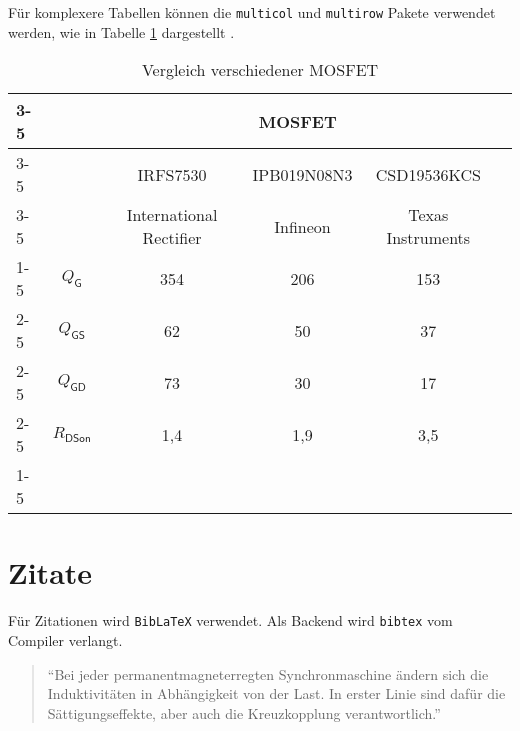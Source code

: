 Für komplexere Tabellen können die \verb|multicol| und \verb|multirow| Pakete verwendet werden, wie in Tabelle \ref{tab:vgl_mosfet} dargestellt \cite{dalton}.
\begin{table}[h]
		\centering
	\renewcommand{\arraystretch}{1.6}
\begin{tabular}{lc|c|c|c|l}
	\cline{3-5}
	& \multicolumn{1}{l|}{} & \multicolumn{3}{c|}{MOSFET}             &  \\ \cline{3-5}
	& \multicolumn{1}{l|}{} & IRFS7530       & IPB019N08N3 & CSD19536KCS &  \\ \cline{3-5}
	& \multicolumn{1}{l|}{} & International Rectifier       & Infineon & Texas Instruments &  \\ \cline{1-5}
	
	\multicolumn{1}{|l|}{\multirow{4}{*}{\begin{turn}{90}Parameter\end{turn}}} & $Q_{\mathsf{G}}$                    &   354 \nano\coulomb             &  206 \nano\coulomb           &   153 \nano\coulomb      &  \\ \cline{2-5}
	\multicolumn{1}{|l|}{}                                                           & $Q_{\mathsf{GS}}$                   &  62 \nano\coulomb             &  50 \nano\coulomb          &  37 \nano\coulomb       &  \\ \cline{2-5}
	\multicolumn{1}{|l|}{}                                                           & $Q_{\mathsf{GD}}$                   & 73 \nano\coulomb              &  30 \nano\coulomb           &  17 \nano\coulomb       &  \\ \cline{2-5}
	\multicolumn{1}{|l|}{}                                                           & $R_{\mathsf{DSon}}$                 & 1,4 \milli\ohm & 1,9 \milli\ohm            &  3,5 \milli\ohm        &  \\ \cline{1-5}
\end{tabular}
	
	\caption{Vergleich verschiedener MOSFET \cite{dalton}}
	\label{tab:vgl_mosfet}
\end{table}
\FloatBarrier

\section{Zitate}\label{sec:cite}
Für Zitationen wird \verb|BibLaTeX| verwendet. Als Backend wird \verb|bibtex| vom Compiler verlangt.


\begin{quote}
\enquote{Bei jeder permanentmagneterregten Synchronmaschine ändern sich die Induktivitäten in Abhängigkeit von der Last. In erster Linie sind dafür die Sättigungseffekte, aber auch die Kreuzkopplung verantwortlich.} \autocite[S.~2]{ternes2015}
\end{quote}

